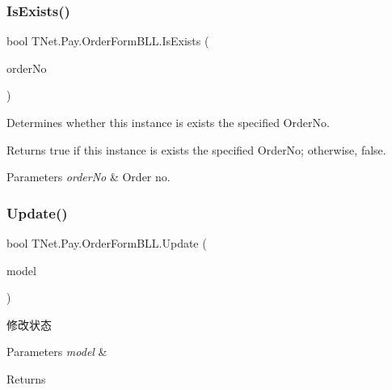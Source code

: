 \subsubsection{\texorpdfstring{Is\+Exists()}{IsExists()}}
{\footnotesize\ttfamily bool T\+Net.\+Pay.\+Order\+Form\+B\+L\+L.\+Is\+Exists (\begin{DoxyParamCaption}\item[{string}]{order\+No }\end{DoxyParamCaption})}



Determines whether this instance is exists the specified Order\+No. 

\begin{DoxyReturn}{Returns}
{\ttfamily true} if this instance is exists the specified Order\+No; otherwise, {\ttfamily false}.
\end{DoxyReturn}

\begin{DoxyParams}{Parameters}
{\em order\+No} & Order no.\\
\hline
\end{DoxyParams}
\mbox{\label{class_t_net_1_1_pay_1_1_order_form_b_l_l_a23be1ab41b05a4e569a03f335241ee59}} 
\subsubsection{\texorpdfstring{Update()}{Update()}}
{\footnotesize\ttfamily bool T\+Net.\+Pay.\+Order\+Form\+B\+L\+L.\+Update (\begin{DoxyParamCaption}\item[{\mbox{\hyperlink{class_t_net_1_1_pay_1_1_order_info}{Order\+Info}}}]{model }\end{DoxyParamCaption})}



修改状态 


\begin{DoxyParams}{Parameters}
{\em model} & \\
\hline
\end{DoxyParams}
\begin{DoxyReturn}{Returns}

\end{DoxyReturn}
\mbox{\label{class_t_net_1_1_pay_1_1_order_form_b_l_l_adb4d140843d6eb01eb78c2b319be6bd9}} 

